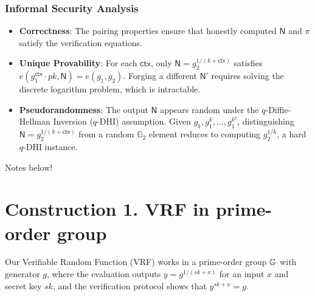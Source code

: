 \subsubsection{Informal Security Analysis}
\begin{itemize}
    \item \textbf{Correctness}: The pairing properties ensure that honestly computed $\mathsf{N}$ and $\pi$ satisfy the verification equations.
    \item \textbf{Unique Provability}: For each $\textsf{ctx}$, only $\mathsf{N} = g_2^{1/(k + \textsf{ctx})}$ satisfies $e(g_1^{\textsf{ctx}} \cdot pk, \mathsf{N}) = e(g_1, g_2)$. Forging a different $\mathsf{N}'$ requires solving the discrete logarithm problem, which is intractable.
    \item \textbf{Pseudorandomness}: The output $\mathsf{N}$ appears random under the $q$-Diffie-Hellman Inversion ($q$-DHI) assumption. Given $g_1, g_1^k, \ldots, g_1^{k^q}$, distinguishing $\mathsf{N} = g_2^{1/(k + \textsf{ctx})}$ from a random $\mathbb{G}_2$ element reduces to computing $g_2^{1/k}$, a hard $q$-DHI instance.
\end{itemize}













Notes below! 





\section{Construction 1. VRF in prime-order group}
Our Verifiable Random Function (VRF) works in a prime-order group $\mathbb{G}$ with generator $g$, where the evaluation outputs $y = g^{1/(sk + x)}$ for an input $x$ and secret key $sk$, and the verification protocol shows that $y^{sk + x} = g$.

